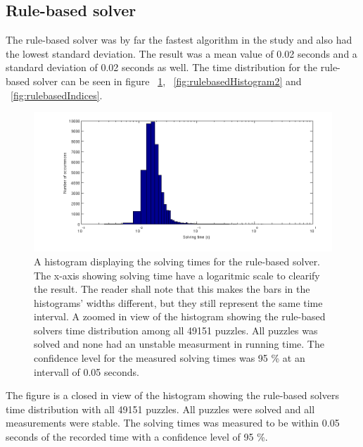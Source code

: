 \documentclass[a4paper,11pt]{kth-mag}
\begin{document}
\FloatBarrier
\subsection{Rule-based solver}
The rule-based solver was by far the fastest algorithm in the study and also had the lowest standard deviation. 
The result was a mean value of 0.02 seconds and a standard deviation of 0.02 seconds as well. 
The time distribution for the rule-based solver can be seen in 
figure ~\ref{fig:rulebasedHistogram}, ~\ref{fig:rulebasedHistogram2} and ~\ref{fig:rulebasedIndices}.

\begin{figure}[here] 
\centering
\includegraphics[width=15cm]{images/rulebased_histogram.png}
\caption{A histogram displaying the solving times for the rule-based solver. The x-axis showing solving time have a logaritmic scale to clearify the result. The reader shall note that this makes the bars in the histograms' widths different, but they still represent the same time interval.
A zoomed in view of the histogram showing the rule-based solvers time distribution among all 49151 puzzles. All puzzles was solved and none had an unstable measurment in running time. The confidence level for the measured solving times was 95 \% at an intervall of 0.05 seconds.}
\label{fig:rulebasedHistogram}
\end{figure}

The figure is a closed in view of the histogram showing the rule-based solvers time distribution with all 49151 puzzles. 
All puzzles were solved and all measurements were stable. The solving times was measured to be within 0.05 seconds of the recorded time with a confidence level of 95 \%. 
\end{document}
